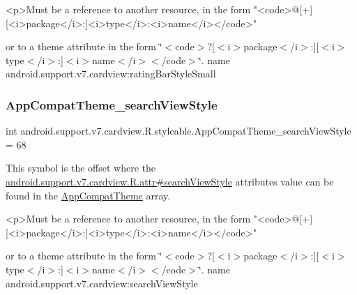 \begin{DoxyVerb}      <p>Must be a reference to another resource, in the form "<code>@[+][<i>package</i>:]<i>type</i>:<i>name</i></code>"
\end{DoxyVerb}
 or to a theme attribute in the form \char`\"{}$<$code$>$?\mbox{[}$<$i$>$package$<$/i$>$\+:\mbox{]}\mbox{[}$<$i$>$type$<$/i$>$\+:\mbox{]}$<$i$>$name$<$/i$>$$<$/code$>$\char`\"{}.  name android.\+support.\+v7.\+cardview\+:rating\+Bar\+Style\+Small \mbox{\label{classandroid_1_1support_1_1v7_1_1cardview_1_1R_1_1styleable_a71e0ea183bad4ce323aadbefc4dd0910}} 
\subsubsection{\texorpdfstring{App\+Compat\+Theme\+\_\+search\+View\+Style}{AppCompatTheme\_searchViewStyle}}
{\footnotesize\ttfamily int android.\+support.\+v7.\+cardview.\+R.\+styleable.\+App\+Compat\+Theme\+\_\+search\+View\+Style = 68\hspace{0.3cm}{\ttfamily [static]}}

This symbol is the offset where the \hyperlink{classandroid_1_1support_1_1v7_1_1cardview_1_1R_1_1attr_a4054d03c18a6e9d5e84784de333be406}{android.\+support.\+v7.\+cardview.\+R.\+attr\#search\+View\+Style} attribute\textquotesingle{}s value can be found in the \hyperlink{classandroid_1_1support_1_1v7_1_1cardview_1_1R_1_1styleable_a52e6f69f954ecc2622d72c0b4d298938}{App\+Compat\+Theme} array.

\begin{DoxyVerb}      <p>Must be a reference to another resource, in the form "<code>@[+][<i>package</i>:]<i>type</i>:<i>name</i></code>"
\end{DoxyVerb}
 or to a theme attribute in the form \char`\"{}$<$code$>$?\mbox{[}$<$i$>$package$<$/i$>$\+:\mbox{]}\mbox{[}$<$i$>$type$<$/i$>$\+:\mbox{]}$<$i$>$name$<$/i$>$$<$/code$>$\char`\"{}.  name android.\+support.\+v7.\+cardview\+:search\+View\+Style \mbox{\label{classandroid_1_1support_1_1v7_1_1cardview_1_1R_1_1styleable_a2fa09f08a3cd57107f1bbb78f73175ce}} 
